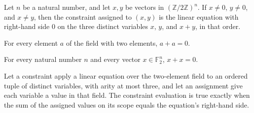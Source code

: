 \begin{theorem}
\label{FABL.blrCSPConstraint_eq_distinct_of_not_collision}
\leanok
{}
Let $n$ be a natural number, and let $x,y$ be vectors in $(\mathbb{Z}/2\mathbb{Z})^n$.
If $x\neq 0$, $y\neq 0$, and $x\neq y$, then the constraint assigned to $(x,y)$ is the
linear equation with right-hand side $0$ on the three distinct variables $x$, $y$, and
$x+y$, in that order.
\end{theorem}

\begin{theorem}
\leanok
{}
For every element $a$ of the field with two elements, $a+a=0$.
\end{theorem}

\begin{theorem}
\leanok
{}
For every natural number $n$ and every vector $x\in\mathbb{F}_2^n$, $x+x=0$.
\end{theorem}

\begin{definition}
\label{FABL.maxAtMostThreeLinConstraintEval}
\leanok
{}
Let a constraint apply a linear equation over the two-element field to an ordered tuple
of distinct variables, with arity at most three, and let an assignment give each
variable a value in that field. The constraint evaluation is true exactly when the sum
of the assigned values on its scope equals the equation’s right-hand side.
\end{definition}

